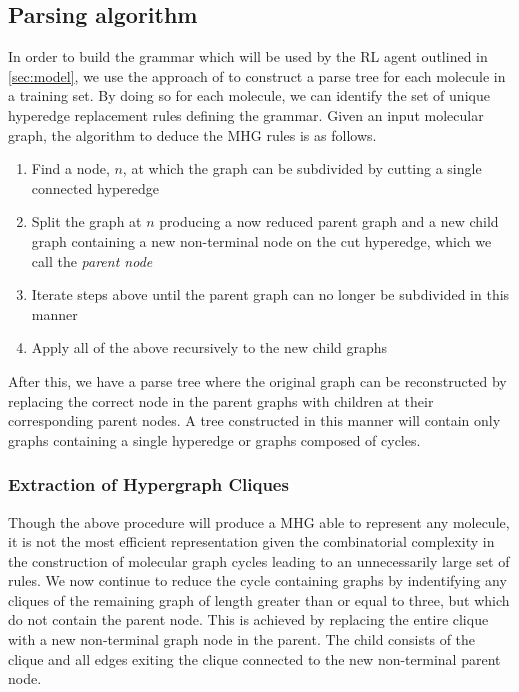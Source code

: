 \documentclass{article}
\begin{document}
\subsection{Parsing algorithm}\label{sec:parsing}
In order to build the grammar which will be used by the RL agent outlined in \ref{sec:model}, we use the approach of \cite{kajino2018} to construct a parse tree for each molecule in a training set. By doing so for each molecule, we can identify the set of unique hyperedge replacement rules defining the grammar. Given an input molecular graph, the algorithm to deduce the MHG rules is as follows.
\begin{enumerate}
	\item Find a node, $n$, at which the graph can be subdivided by cutting a single connected hyperedge 
    \item Split the graph at $n$ producing a now reduced parent graph and a new child graph containing a new non-terminal node on the cut hyperedge, which we call the {\em parent node}
    \item Iterate steps above until the parent graph can no longer be subdivided in this manner
    \item Apply all of the above recursively to the new child graphs
\end{enumerate}
After this, we have a parse tree where the original graph can be reconstructed by replacing the correct node in the parent graphs with children at their corresponding parent nodes. A tree constructed in this manner will contain only graphs containing a single hyperedge or graphs composed of cycles.


\subsubsection{Extraction of Hypergraph Cliques}\label{sec:cliques}
Though the above procedure will produce a MHG able to represent any molecule, it is not the most efficient representation given the combinatorial complexity in the construction of molecular graph cycles leading to an unnecessarily large set of rules. We now continue to reduce the cycle containing graphs by indentifying any cliques of the remaining graph of length greater than or equal to three, but which do not contain the parent node. This is achieved by replacing the entire clique with a new non-terminal graph node in the parent. The child consists of the clique and all edges exiting the clique connected to the new non-terminal parent node.
\end{document}
